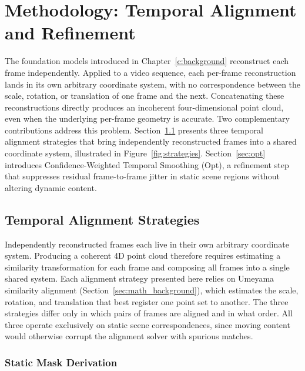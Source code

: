 \chapter{Methodology: Temporal Alignment and Refinement}
\label{c:methodology}

The foundation models introduced in Chapter~\ref{c:background} reconstruct each frame
independently. Applied to a video sequence, each per-frame reconstruction lands in its own
arbitrary coordinate system, with no correspondence between the scale, rotation, or
translation of one frame and the next. Concatenating these reconstructions directly produces
an incoherent four-dimensional point cloud, even when the underlying per-frame geometry is
accurate. Two complementary contributions address this problem. Section~\ref{sec:alignment_strategies}
presents three temporal alignment strategies that bring independently reconstructed frames
into a shared coordinate system, illustrated in Figure~\ref{fig:strategies}.
Section~\ref{sec:opt} introduces Confidence-Weighted Temporal Smoothing (Opt), a
refinement step that suppresses residual frame-to-frame jitter in static scene regions
without altering dynamic content.

\section{Temporal Alignment Strategies}
\label{sec:alignment_strategies}

Independently reconstructed frames each live in their own arbitrary coordinate system.
Producing a coherent 4D point cloud therefore requires estimating a similarity
transformation for each frame and composing all frames into a single shared system.
Each alignment strategy presented here relies on Umeyama similarity alignment
(Section~\ref{sec:math_background}), which estimates the scale, rotation, and translation
that best register one point set to another. The three strategies differ only in which
pairs of frames are aligned and in what order. All three operate exclusively on static
scene correspondences, since moving content would otherwise corrupt the alignment solver
with spurious matches.

\subsection{Static Mask Derivation}
\label{sec:static_mask_derivation}


